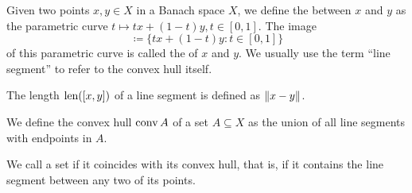 \begin{definition}\label{def:convex_set}\mbox{}
  \begin{DefEnum}
     Given two points \( x, y \in X \) in a Banach space \( X \), we define the  between \( x \) and \( y \) as the parametric curve \( t \mapsto tx + (1-t)y, t \in [0, 1] \). The image
    \begin{equation*}
      [x, y] \coloneqq \{ tx + (1-t)y \colon t \in [0, 1] \}
    \end{equation*}
    of this parametric curve is called the  of \( x \) and \( y \). We usually use the term \enquote{line segment} to refer to the convex hull itself.

    The length \( \operatorname{len}([x, y]) \) of a line segment is defined as \( \left\Vert x - y \right\Vert \).

     We define the convex hull \( \operatorname{conv} A \) of a set \( A \subseteq X \) as the union of all line segments with endpoints in \( A \).

     We call a set  if it coincides with its convex hull, that is, if it contains the line segment between any two of its points.
  \end{DefEnum}
\end{definition}

